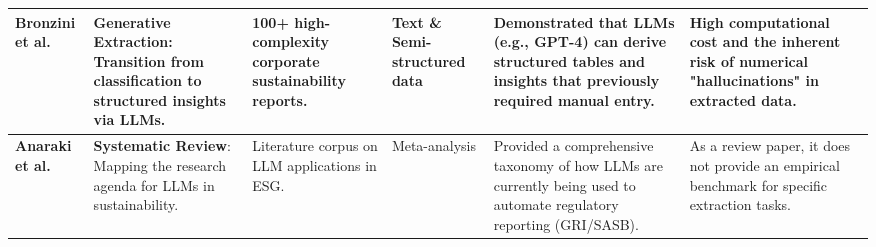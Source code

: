 \documentclass[english, online, cse, master]{dithesis}
\begin{document}
\begin{landscape}
\begin{table}[p]
\begin{tabularx}{\linewidth}{|p{1.8cm}|p{3.5cm}|p{3cm}|p{1.8cm}|X|X|}
\textbf{Bronzini et al.}  \parencite{marco_bronzini_bf94d949} & \textbf{Generative Extraction}: Transition from classification to structured insights via LLMs. & 100+ high-complexity corporate sustainability reports. & Text \& Semi-structured data & Demonstrated that LLMs (e.g., GPT-4) can derive structured tables and insights that previously required manual entry. & High computational cost and the inherent risk of numerical "hallucinations" in extracted data. \\ \hline
\textbf{Anaraki et al.}  \parencite{seyed_alireza_mousavian_anaraki_b56a1c0f} & \textbf{Systematic Review}: Mapping the research agenda for LLMs in sustainability. & Literature corpus on LLM applications in ESG. & Meta-analysis & Provided a comprehensive taxonomy of how LLMs are currently being used to automate regulatory reporting (GRI/SASB). & As a review paper, it does not provide an empirical benchmark for specific extraction tasks. \\ \hline
\end{tabularx}
\end{table}
\end{landscape}
\end{document}
